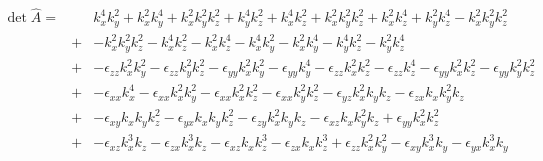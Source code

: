 \documentclass[12pt,a4paper,twoside,openright,BCOR10mm,headsepline,titlepage,abstracton,chapterprefix,final]{scrreprt}
\newcommand\wavenumber{k}
\newcommand\scalarpermittivity{\epsilon}
\begin{document}
\begin{eqnarray}
 \det \hat{A} =&& 
       \wavenumber_x^4 \wavenumber_y^2 + \wavenumber_x^2 \wavenumber_y^4  + \wavenumber_x^2 \wavenumber_y^2 \wavenumber_z^2 + \wavenumber_y^4 \wavenumber_z^2 
    +  \wavenumber_x^4 \wavenumber_z^2 + \wavenumber_x^2 \wavenumber_y^2 \wavenumber_z^2 + \wavenumber_x^2 \wavenumber_z^4 + \wavenumber_y^2 \wavenumber_z^4 
    -  \wavenumber_x^2 \wavenumber_y^2 \wavenumber_z^2  
 \nonumber\\&+&
    -  \wavenumber_x^2 \wavenumber_y^2 \wavenumber_z^2   
    -  \wavenumber_x^4 \wavenumber_z^2   
    -  \wavenumber_x^2 \wavenumber_z^4  
    -  \wavenumber_x^4 \wavenumber_y^2  
    -  \wavenumber_x^2 \wavenumber_y^4      
    -  \wavenumber_y^4 \wavenumber_z^2  
    -  \wavenumber_y^2 \wavenumber_z^4     
 \nonumber\\[2ex]
 &+& 
    - \scalarpermittivity_{zz} \wavenumber_x^2 \wavenumber_y^2 - \scalarpermittivity_{zz} \wavenumber_y^2 \wavenumber_z^2 - \scalarpermittivity_{yy} \wavenumber_x^2 \wavenumber_y^2 - \scalarpermittivity_{yy} \wavenumber_y^4 
    - \scalarpermittivity_{zz} \wavenumber_x^2 \wavenumber_z^2 - \scalarpermittivity_{zz} \wavenumber_z^4 - \scalarpermittivity_{yy} \wavenumber_x^2 \wavenumber_z^2 - \scalarpermittivity_{yy} \wavenumber_y^2 \wavenumber_z^2 
 \nonumber\\&+& 
    - \scalarpermittivity_{xx} \wavenumber_x^4 - \scalarpermittivity_{xx} \wavenumber_x^2 \wavenumber_y^2 - \scalarpermittivity_{xx} \wavenumber_x^2 \wavenumber_z^2 - \scalarpermittivity_{xx} \wavenumber_y^2 \wavenumber_z^2  
    - \scalarpermittivity_{yz} \wavenumber_x^2 \wavenumber_y \wavenumber_z - \scalarpermittivity_{zx} \wavenumber_x \wavenumber_y^2 \wavenumber_z  
 \nonumber\\&+&   
    -  \scalarpermittivity_{xy} \wavenumber_x \wavenumber_y \wavenumber_z^2  
    - \scalarpermittivity_{yx} \wavenumber_x \wavenumber_y \wavenumber_z^2 - \scalarpermittivity_{zy} \wavenumber_x^2 \wavenumber_y \wavenumber_z  
    -  \scalarpermittivity_{xz} \wavenumber_x \wavenumber_y^2 \wavenumber_z   
    +  \scalarpermittivity_{yy} \wavenumber_x^2 \wavenumber_z^2  
 \nonumber\\&+&
    - \scalarpermittivity_{xz} \wavenumber_x^3 \wavenumber_z - \scalarpermittivity_{zx} \wavenumber_x^3 \wavenumber_z 
    - \scalarpermittivity_{xz} \wavenumber_x \wavenumber_z^3 - \scalarpermittivity_{zx} \wavenumber_x \wavenumber_z^3  
    +  \scalarpermittivity_{zz} \wavenumber_x^2 \wavenumber_y^2  
    - \scalarpermittivity_{xy} \wavenumber_x^3 \wavenumber_y - \scalarpermittivity_{yx} \wavenumber_x^3 \wavenumber_y  

\end{eqnarray}
\end{document}
